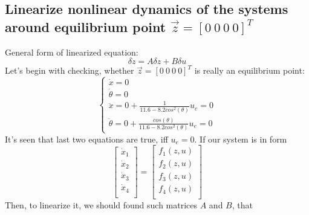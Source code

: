 \documentclass[a4paper,12pt]{article}
\begin{document}
    \subsection{Linearize nonlinear dynamics of the systems around equilibrium point
    $\vec{z} = [0\ 0\ 0\ 0]^T$}
    General form of linearized equation:
    \begin{equation}
        \delta \dot z = A \delta z + B \delta u 
    \end{equation}
    Let's begin with checking, whether $\vec{z} = [0\ 0\ 0\ 0]^T$ is really an 
    equilibrium point:
    \begin{equation}
        \begin{cases}
            \dot x = 0\\
            \dot \theta = 0\\
            \ddot x = 0 +  
            \frac{1}
            {11.6 - 8.2cos^2(\theta)}
            u_e = 0\\
            \ddot \theta = 0 +  
            \frac{cos(\theta)}
            {11.6 - 8.2cos^2(\theta)}u_e =0
        \end{cases}
    \end{equation}
    It's seen that last two equations are true, iff $u_e=0$.
    If our system is in form
    \begin{equation}
        \begin{bmatrix}
            \dot x_1\\
            \dot x_2\\
            \dot x_3\\
            \dot x_4\\
        \end{bmatrix}
        =
        \begin{bmatrix}
            f_1(z,u)\\
            f_2(z,u)\\
            f_3(z,u)\\
            f_4(z,u)\\
        \end{bmatrix}
    \end{equation}
    Then, to linearize it, we should found such matrices $A$ and $B$, that
\end{document}
